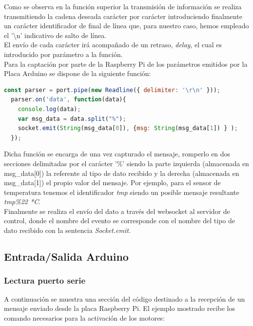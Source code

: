 Como se observa en la función superior la transmisión de información se realiza transmitiendo la cadena deseada carácter por carácter introduciendo finalmente un carácter identificador de final de línea que,
para nuestro caso, hemos empleado el '\textbackslash n' indicativo de salto de línea.\\

El envío de cada carácter irá acompañado de un retraso, \emph{delay}, el cual es introducido por parámetro a la función.\\

Para la captación por parte de la Raspberry Pi de los parámetros emitidos por la Placa Arduino se dispone de la siguiente función:\\

\begin{lstlisting}[language=JavaScript]
  const parser = port.pipe(new Readline({ delimiter: '\r\n' }));
  parser.on('data', function(data){
    console.log(data);
    var msg_data = data.split("%");
    socket.emit(String(msg_data[0]), {msg: String(msg_data[1]) } );
  });

\end{lstlisting}

Dicha función se encarga de una vez capturado el mensaje, romperlo en dos secciones delimitadas por el carácter '\%' siendo la parte izquierda (almacenada en msg\_data[0]) 
la referente al tipo de dato recibido y la derecha (almacenada en msg\_data[1]) el propio valor del mensaje. Por ejemplo, para el sensor de temperatura tenemos el identificador \emph{tmp} 
siendo un posible mensaje resultante \emph{tmp\%22 *C}.\\

Finalmente se realiza el envío del dato a través del websocket al servidor de control, donde el nombre del evento se corresponde con el nombre del tipo de dato recibido con la sentencia \emph{Socket.emit}.\\

\subsection{Entrada/Salida Arduino}

\subsubsection{Lectura puerto serie}

A continuación se muestra una sección del código destinado a la recepción de un mensaje enviado desde la placa Raspberry Pi. El ejemplo mostrado recibe los comando necesarios para
la activación de los motores:\\

